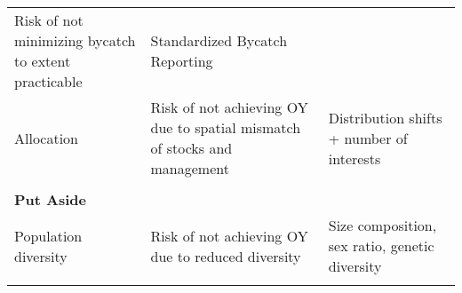 \documentclass[11pt,]{article}
\begin{document}
\begin{longtable}[]{@{}lll@{}}
\begin{minipage}[t]{0.33\columnwidth}
Risk of not minimizing bycatch to extent practicable\strut
\end{minipage} & \begin{minipage}[t]{0.33\columnwidth}\raggedright\strut
Standardized Bycatch Reporting\strut
\end{minipage}\tabularnewline
\begin{minipage}[t]{0.25\columnwidth}\raggedright\strut
Allocation\strut
\end{minipage} & \begin{minipage}[t]{0.33\columnwidth}\raggedright\strut
Risk of not achieving OY due to spatial mismatch of stocks and
management\strut
\end{minipage} & \begin{minipage}[t]{0.33\columnwidth}\raggedright\strut
Distribution shifts + number of interests\strut
\end{minipage}\tabularnewline
\begin{minipage}[t]{0.25\columnwidth}\raggedright\strut
\strut
\end{minipage} & \begin{minipage}[t]{0.33\columnwidth}\raggedright\strut
\strut
\end{minipage} & \begin{minipage}[t]{0.33\columnwidth}\raggedright\strut
\strut
\end{minipage}\tabularnewline
\begin{minipage}[t]{0.25\columnwidth}\raggedright\strut
\textbf{Put Aside}\strut
\end{minipage} & \begin{minipage}[t]{0.33\columnwidth}\raggedright\strut
\strut
\end{minipage} & \begin{minipage}[t]{0.33\columnwidth}\raggedright\strut
\strut
\end{minipage}\tabularnewline
\begin{minipage}[t]{0.25\columnwidth}\raggedright\strut
Population diversity\strut
\end{minipage} & \begin{minipage}[t]{0.33\columnwidth}\raggedright\strut
Risk of not achieving OY due to reduced diversity\strut
\end{minipage} & \begin{minipage}[t]{0.33\columnwidth}\raggedright\strut
Size composition, sex ratio, genetic diversity\strut
\end{minipage}\tabularnewline
\begin{minipage}[t]{0.25\columnwidth}\raggedright\strut

\end{minipage}
\end{longtable}
\end{document}
